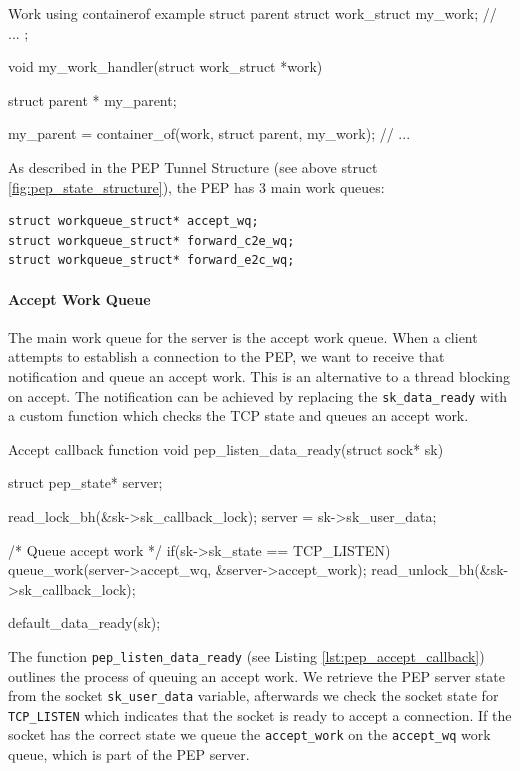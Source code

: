 \documentclass[a4paper,english, 11pt]{report}
\begin{document}
\begin{autonumlstlisting}[label=lst:work_containerof]{Work using containerof example}
struct parent {
    struct work_struct my_work;
    // ...
};

void my_work_handler(struct work_struct *work)
{
   struct parent * my_parent;

   my_parent = container_of(work, struct parent,  my_work);
   // ...
}
\end{autonumlstlisting}

As described in the PEP Tunnel Structure (see above struct \ref{fig:pep_state_structure}), the PEP has 3 main work queues:
\begin{verbatim}
struct workqueue_struct* accept_wq;
struct workqueue_struct* forward_c2e_wq;
struct workqueue_struct* forward_e2c_wq;
\end{verbatim}

\paragraph{Accept Work Queue}
The main work queue for the server is the accept work queue. When a client attempts to establish a connection to the PEP, we want to receive that notification and queue an accept work. This is an alternative to a thread blocking on accept. The notification can be achieved by replacing the \verb|sk_data_ready| with a custom function which checks the TCP state and queues an accept work.\\

\begin{autonumlstlisting}[label=lst:pep_accept_callback]{Accept callback function}
void pep_listen_data_ready(struct sock* sk)
{
	struct pep_state* server;

	read_lock_bh(&sk->sk_callback_lock);
	server = sk->sk_user_data;

	/* Queue accept work */
	if(sk->sk_state == TCP_LISTEN){
		queue_work(server->accept_wq, &server->accept_work);
	}
	read_unlock_bh(&sk->sk_callback_lock);

	default_data_ready(sk);
}
\end{autonumlstlisting}

The function \verb|pep_listen_data_ready| (see Listing \ref{lst:pep_accept_callback}) outlines the process of queuing an accept work. We retrieve the PEP server state from the socket \verb|sk_user_data| variable, afterwards we check the socket state for \verb|TCP_LISTEN| which indicates that the socket is ready to accept a connection. If the socket has the correct state we queue the \verb|accept_work| on the \verb|accept_wq| work queue, which is part of the PEP server.
\end{document}

